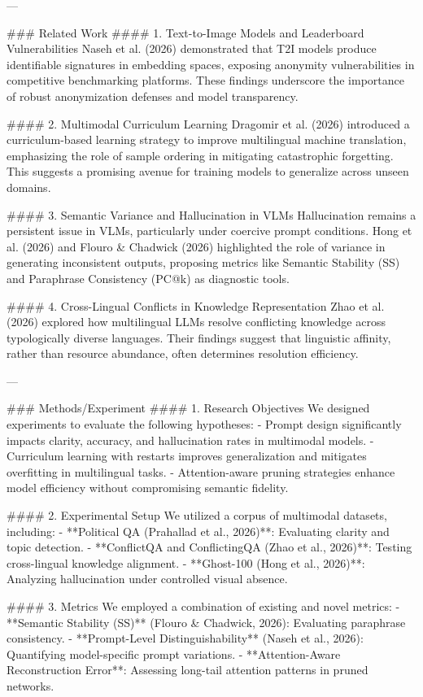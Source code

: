 ---

### Related Work  
#### 1. Text-to-Image Models and Leaderboard Vulnerabilities  
Naseh et al. (2026) demonstrated that T2I models produce identifiable signatures in embedding spaces, exposing anonymity vulnerabilities in competitive benchmarking platforms. These findings underscore the importance of robust anonymization defenses and model transparency.

#### 2. Multimodal Curriculum Learning  
Dragomir et al. (2026) introduced a curriculum-based learning strategy to improve multilingual machine translation, emphasizing the role of sample ordering in mitigating catastrophic forgetting. This suggests a promising avenue for training models to generalize across unseen domains.

#### 3. Semantic Variance and Hallucination in VLMs  
Hallucination remains a persistent issue in VLMs, particularly under coercive prompt conditions. Hong et al. (2026) and Flouro & Chadwick (2026) highlighted the role of variance in generating inconsistent outputs, proposing metrics like Semantic Stability (SS) and Paraphrase Consistency (PC@k) as diagnostic tools.

#### 4. Cross-Lingual Conflicts in Knowledge Representation  
Zhao et al. (2026) explored how multilingual LLMs resolve conflicting knowledge across typologically diverse languages. Their findings suggest that linguistic affinity, rather than resource abundance, often determines resolution efficiency.

---

### Methods/Experiment  
#### 1. Research Objectives  
We designed experiments to evaluate the following hypotheses:  
- Prompt design significantly impacts clarity, accuracy, and hallucination rates in multimodal models.  
- Curriculum learning with restarts improves generalization and mitigates overfitting in multilingual tasks.  
- Attention-aware pruning strategies enhance model efficiency without compromising semantic fidelity.

#### 2. Experimental Setup  
We utilized a corpus of multimodal datasets, including:  
- **Political QA (Prahallad et al., 2026)**: Evaluating clarity and topic detection.  
- **ConflictQA and ConflictingQA (Zhao et al., 2026)**: Testing cross-lingual knowledge alignment.  
- **Ghost-100 (Hong et al., 2026)**: Analyzing hallucination under controlled visual absence.  

#### 3. Metrics  
We employed a combination of existing and novel metrics:  
- **Semantic Stability (SS)** (Flouro & Chadwick, 2026): Evaluating paraphrase consistency.  
- **Prompt-Level Distinguishability** (Naseh et al., 2026): Quantifying model-specific prompt variations.  
- **Attention-Aware Reconstruction Error**: Assessing long-tail attention patterns in pruned networks.


